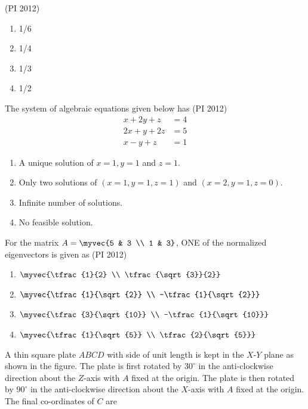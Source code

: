   \hfill{(PI 2012)}
  \begin{multicols}{4}
  \begin{enumerate}
    \item 1/6
    \item 1/4
    \item 1/3
    \item 1/2
  \end{enumerate}
\end{multicols}
\item  The system of algebraic equations given below has
\hfill{(PI 2012)}
  \begin{align*}
x + 2y + z &= 4 \\
2x + y + 2z &= 5 \\
x - y + z &= 1
\end{align*}
\begin{enumerate}
\item A unique solution of $x=1, y=1$ and $z=1$.
\item Only two solutions of $(x=1, y=1, z=1)$ and $(x=2, y=1, z=0)$.
\item Infinite number of solutions.
\item No feasible solution.
\end{enumerate}
%
\item  For the matrix $A=\myvec{5 & 3 \\ 1 & 3}$, ONE of the normalized eigenvectors is given as
\hfill{(PI 2012)}
  \begin{multicols}{4}
\begin{enumerate}
\item $\myvec{\tfrac{1}{2} \\ \tfrac{\sqrt{3}}{2}}$
\item $\myvec{\tfrac{1}{\sqrt{2}} \\ -\tfrac{1}{\sqrt{2}}}$
\item $\myvec{\tfrac{3}{\sqrt{10}} \\ -\tfrac{1}{\sqrt{10}}}$
\item $\myvec{\tfrac{1}{\sqrt{5}} \\ \tfrac{2}{\sqrt{5}}}$
\end{enumerate}
\end{multicols}
\item A thin square plate $ABCD$ with side of unit length is kept in the $X$-$Y$ plane as shown in the figure. The plate is first rotated by $30^\circ$ in the anti-clockwise direction about the $Z$-axis with $A$ fixed at the origin. The plate is then rotated by $90^\circ$ in the anti-clockwise direction about the $X$-axis with $A$ fixed at the origin. The final co-ordinates of $C$ are

